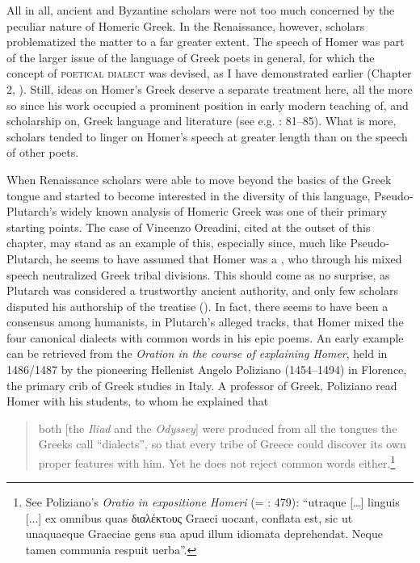 All in all, ancient and Byzantine scholars were not too much concerned by the peculiar nature of Homeric Greek. In the Renaissance, however, scholars problematized the matter to a far greater extent. The speech of Homer was part of the larger issue of the language of Greek poets in general, for which the concept of \textsc{poetical} \textsc{dialect} was devised, as I have demonstrated earlier (Chapter 2, ). Still, ideas on Homer’s Greek deserve a separate treatment here, all the more so since his work occupied a prominent position in early modern teaching of, and scholarship on, Greek language and literature (see e.g. \citealt{Botley2010}: 81–85). What is more, scholars tended to linger on Homer’s speech at greater length than on the speech of other poets.

When Renaissance scholars were able to move beyond the basics of the Greek tongue and started to become interested in the diversity of this language, Pseudo-Plutarch’s widely known analysis of Homeric Greek was one of their primary starting points. The case of Vincenzo Oreadini, cited at the outset of this chapter, may stand as an example of this, especially since, much like Pseudo-Plutarch, he seems to have assumed that Homer was a , who through his mixed speech neutralized Greek tribal divisions. This should come as no surprise, as Plutarch was considered a trustworthy ancient authority, and only few scholars disputed his authorship of the treatise (\citealt{VanRooy2018c}). In fact, there seems to have been a consensus among humanists, in Plutarch’s alleged tracks, that Homer mixed the four canonical dialects with common words in his epic poems. An early example can be retrieved from the \textit{Oration in the course of explaining Homer}, held in 1486/1487 by the pioneering Hellenist Angelo Poliziano (1454–1494) in Florence, the primary crib of Greek studies in Italy. A professor of Greek, Poliziano read Homer with his students, to whom he explained that

\begin{quote}
both [the \textit{Iliad} and the \textit{Odyssey}] were produced from all the tongues the Greeks call “dialects”, so that every tribe of Greece could discover its own proper features with him. Yet he does not reject common words either.\footnote{See Poliziano’s \textit{Oratio in expositione Homeri} (= \citealt{Poliziano1553}: 479): “utraque […] linguis [...] ex omnibus quas διαλέκτoυς Graeci uocant, conflata est, sic ut unaquaeque Graeciae gens sua apud illum idiomata deprehendat. Neque tamen communia respuit uerba”.}
\end{quote}

